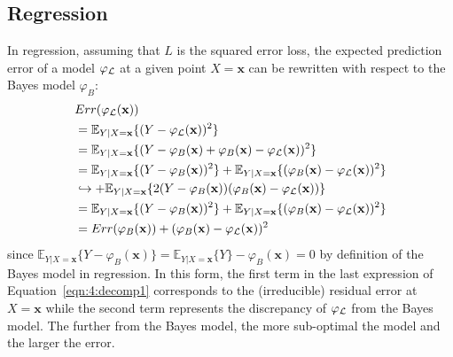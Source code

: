 \subsection{Regression}
\label{sec:bias-variance:regression}

In regression, assuming that $L$ is the squared error loss, the expected
prediction error of a model $\varphi_{\cal L}$ at a given point $X=\mathbf{x}$
can be rewritten with respect to the Bayes model $\varphi_B$:
\begin{align}
& Err(\varphi_{\cal L}(\mathbf{x})) \nonumber \\
&= \mathbb{E}_{Y|X=\mathbf{x}} \{ (Y - \varphi_{\cal L}(\mathbf{x}))^2 \} \nonumber \\
&= \mathbb{E}_{Y|X=\mathbf{x}} \{ (Y -\varphi_B(\mathbf{x}) + \varphi_B(\mathbf{x}) - \varphi_{\cal L}(\mathbf{x}))^2 \} \nonumber \\
&= \mathbb{E}_{Y|X=\mathbf{x}} \{ (Y -\varphi_B(\mathbf{x}))^2  \} + \mathbb{E}_{Y|X=\mathbf{x}} \{ (\varphi_B(\mathbf{x}) - \varphi_{\cal L}(\mathbf{x}))^2 \} \nonumber \\
& \hookrightarrow + \mathbb{E}_{Y|X=\mathbf{x}} \{ 2 (Y - \varphi_B(\mathbf{x}))(\varphi_B(\mathbf{x}) - \varphi_{\cal L}(\mathbf{x})) \} \nonumber \\
&= \mathbb{E}_{Y|X=\mathbf{x}} \{ (Y -\varphi_B(\mathbf{x}))^2 \} + \mathbb{E}_{Y|X=\mathbf{x}} \{ (\varphi_B(\mathbf{x}) - \varphi_{\cal L}(\mathbf{x}))^2 \} \nonumber \\
&= Err(\varphi_B(\mathbf{x})) +  (\varphi_B(\mathbf{x}) - \varphi_{\cal L}(\mathbf{x}))^2 \label{eqn:4:decomp1}
\end{align}
since $\mathbb{E}_{Y|X=\mathbf{x}} \{ Y - \varphi_B(\mathbf{x}) \} =
\mathbb{E}_{Y|X=\mathbf{x}} \{ Y \} - \varphi_B(\mathbf{x}) = 0$ by definition
of the Bayes model in regression. In this form, the first term in the last
expression of Equation~\ref{eqn:4:decomp1} corresponds to the (irreducible)
residual error  at $X=\mathbf{x}$ while the second term represents the
discrepancy of $\varphi_{\cal L}$ from the Bayes model. The further from the
Bayes model, the more sub-optimal the model and the larger the error.

